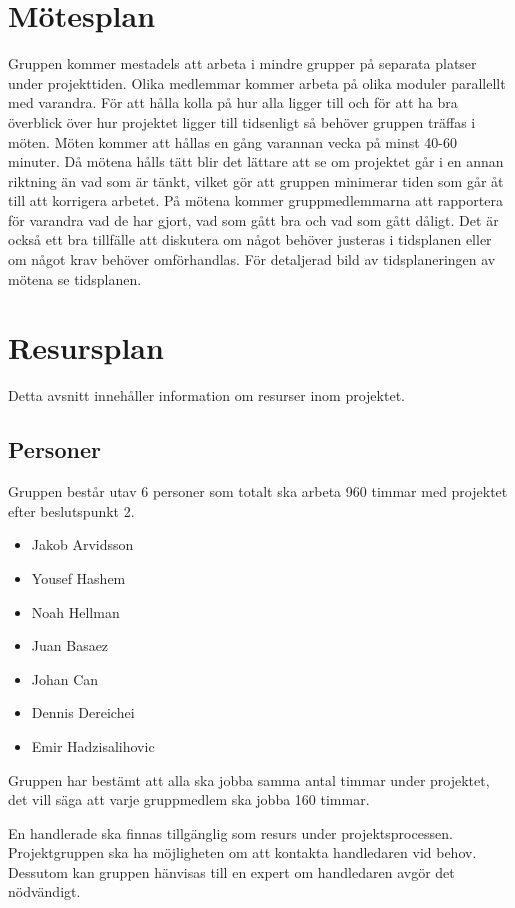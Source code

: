 \documentclass[projektplan/plan.tex]{subfiles}
\begin{document}
\section{Mötesplan}
Gruppen kommer mestadels att arbeta i mindre grupper på separata platser under projekttiden. Olika medlemmar kommer arbeta på olika moduler parallellt med varandra. För att hålla kolla på hur alla ligger till och för att ha bra överblick över hur projektet ligger till tidsenligt så behöver gruppen träffas i möten. Möten kommer att hållas en gång varannan vecka på minst 40-60 minuter. Då mötena hålls tätt blir det lättare att se om projektet går i en annan riktning än vad som är tänkt, vilket gör att gruppen minimerar tiden som går åt till att korrigera arbetet. På mötena kommer gruppmedlemmarna att rapportera för varandra vad de har gjort, vad som gått bra och vad som gått dåligt. Det är också ett bra tillfälle att diskutera om något behöver justeras i tidsplanen eller om något krav behöver omförhandlas. För detaljerad bild av tidsplaneringen av mötena se tidsplanen.
\section{Resursplan}
Detta avsnitt innehåller information om resurser inom projektet.
\subsection{Personer}
Gruppen består utav 6 personer som totalt ska arbeta 960 timmar med projektet efter beslutspunkt 2.

\begin{itemize}
\item Jakob Arvidsson
\item Yousef Hashem
\item Noah Hellman
\item Juan Basaez
\item Johan Can
\item Dennis Dereichei
\item Emir Hadzisalihovic
\end{itemize}

Gruppen har bestämt att alla ska jobba samma antal timmar under projektet, det vill säga att varje gruppmedlem ska jobba 160 timmar.
\newline\newline

En handlerade ska finnas tillgänglig som resurs under projektsprocessen. Projektgruppen ska ha möjligheten om att kontakta handledaren vid behov. Dessutom kan gruppen hänvisas till en expert om handledaren avgör det nödvändigt.
\end{document}
